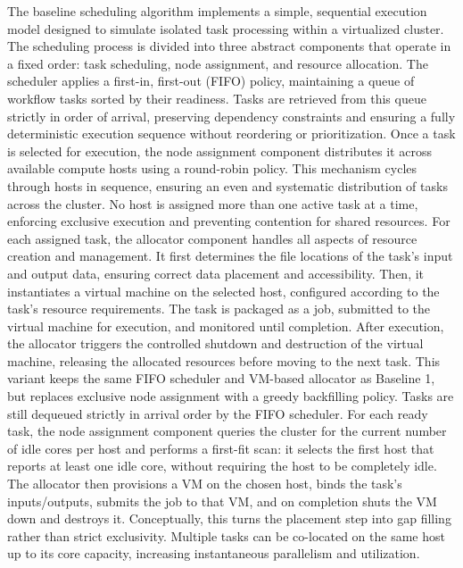 The baseline scheduling algorithm implements a simple, sequential execution model designed to simulate isolated task processing within a virtualized cluster. The scheduling process is divided into three abstract components that operate in a fixed order: task scheduling, node assignment, and resource allocation. The scheduler applies a first-in, first-out (FIFO) policy, maintaining a queue of workflow tasks sorted by their readiness. Tasks are retrieved from this queue strictly in order of arrival, preserving dependency constraints and ensuring a fully deterministic execution sequence without reordering or prioritization.
Once a task is selected for execution, the node assignment component distributes it across available compute hosts using a round-robin policy. This mechanism cycles through hosts in sequence, ensuring an even and systematic distribution of tasks across the cluster. No host is assigned more than one active task at a time, enforcing exclusive execution and preventing contention for shared resources.
For each assigned task, the allocator component handles all aspects of resource creation and management. It first determines the file locations of the task’s input and output data, ensuring correct data placement and accessibility. Then, it instantiates a virtual machine on the selected host, configured according to the task’s resource requirements. The task is packaged as a job, submitted to the virtual machine for execution, and monitored until completion. After execution, the allocator triggers the controlled shutdown and destruction of the virtual machine, releasing the allocated resources before moving to the next task.
This variant keeps the same FIFO scheduler and VM-based allocator as Baseline 1, but replaces exclusive node assignment with a greedy backfilling policy. Tasks are still dequeued strictly in arrival order by the FIFO scheduler. For each ready task, the node assignment component queries the cluster for the current number of idle cores per host and performs a first-fit scan: it selects the first host that reports at least one idle core, without requiring the host to be completely idle. The allocator then provisions a VM on the chosen host, binds the task’s inputs/outputs, submits the job to that VM, and on completion shuts the VM down and destroys it.
Conceptually, this turns the placement step into gap filling rather than strict exclusivity. Multiple tasks can be co-located on the same host up to its core capacity, increasing instantaneous parallelism and utilization.
